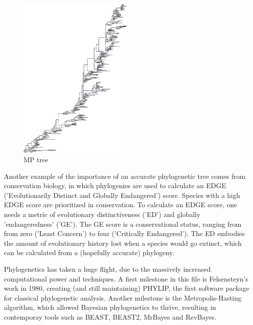\begin{figure}[H]
  \includegraphics[width=0.5\textwidth]{bush_et_al_1999}
  \caption{
    MP tree
  }
  \label{fig:bush_et_al_1999}
\end{figure}

Another example of the importance of an accurate phylogenetic tree 
comes from conservation biology, in which phylogenies are used to
calculate an EDGE ('Evolutionarily Distinct and Globally Endangered') 
score. Species with a high EDGE score are prioritized in conservation.
To calculate an EDGE score, one needs a metric of evolutionary 
distinctiveness ('ED') and globally 'endangeredness' ('GE').
The GE score is a conservational status, ranging from from zero ('Least Concern') 
to four ('Critically Endangered'). 
The ED embodies the amount of evolutionary history lost when a species 
would go extinct, which can be calculated from a (hopefully accurate) 
phylogeny.

%
%


Phylogenetics has taken a huge flight, due to the massively increased
computational power and techniques. A first milestone in this file is 
Felsensteyn's work in 1980, creating (and still maintaining) PHYLIP, 
the first software package for classical phylogenetic analysis.
Another milestone is the Metropolis-Hasting algorithm, which 
allowed Bayesian phylogenetics to thrive, resulting in
contemporay tools such as BEAST, BEAST2, MrBayes and RevBayes.

